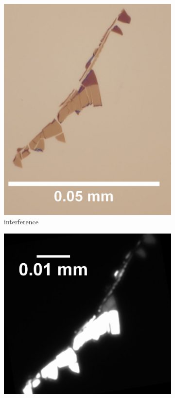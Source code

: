 \begin{figure}[H]
    \centering
    \begin{subfigure}{0.4\textwidth}
        \centering
        \includegraphics[width=\textwidth]{img/output_t1/M1_2_100_adj}
        \caption{interference}
	      \label{fig_mono_spec2_int}
    \end{subfigure}
    \begin{subfigure}{0.4\textwidth}
        \centering
        \includegraphics[width=\textwidth]{img/output_t1/M1_2_50_adj_photo}

\end{subfigure}
\end{figure}
